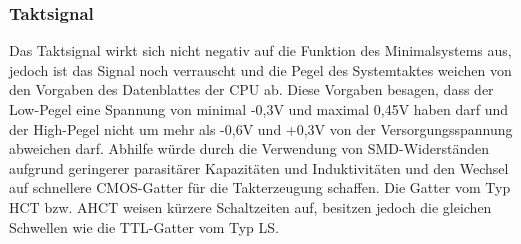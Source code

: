 
\subsubsection{Taktsignal}
Das Taktsignal wirkt sich nicht negativ auf die Funktion des Minimalsystems aus, jedoch ist das Signal noch verrauscht und die Pegel des Systemtaktes weichen von den Vorgaben des Datenblattes der CPU ab. Diese Vorgaben besagen, dass der Low-Pegel eine Spannung von minimal -0,3V und maximal 0,45V haben darf und der High-Pegel nicht um mehr als -0,6V und +0,3V von der Versorgungsspannung abweichen darf. Abhilfe würde durch die Verwendung von SMD-Widerständen aufgrund geringerer parasitärer Kapazitäten und Induktivitäten und den Wechsel auf schnellere CMOS-Gatter für die Takterzeugung schaffen. Die Gatter vom Typ HCT bzw. AHCT weisen kürzere Schaltzeiten auf, besitzen jedoch die gleichen Schwellen wie die TTL-Gatter vom Typ LS.


